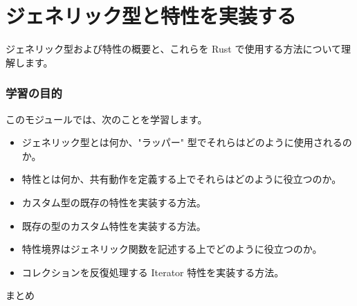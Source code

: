 \section{ジェネリック型と特性を実装する}

ジェネリック型および特性の概要と、これらを Rust で使用する方法について理解します。

\subsubsection{学習の目的}

このモジュールでは、次のことを学習します。

\begin{itemize}
\item ジェネリック型とは何か、"ラッパー" 型でそれらはどのように使用されるのか。
\item 特性とは何か、共有動作を定義する上でそれらはどのように役立つのか。
\item カスタム型の既存の特性を実装する方法。
\item 既存の型のカスタム特性を実装する方法。
\item 特性境界はジェネリック関数を記述する上でどのように役立つのか。
\item コレクションを反復処理する Iterator 特性を実装する方法。
\end{itemize}

まとめ